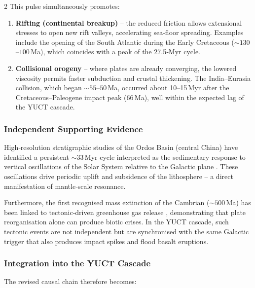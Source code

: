 \documentclass[11pt,a4paper]{article}
\begin{document}
\begin{multicols}{2}
		This pulse simultaneously promotes:
		
		\begin{enumerate}
			\item \textbf{Rifting (continental breakup)} – the reduced friction allows extensional 
			stresses to open new rift valleys, accelerating sea‑floor spreading.  
			Examples include the opening of the South Atlantic during the Early Cretaceous 
			(\(\sim 130\)–\(100\) Ma), which coincides with a peak of the 27.5‑Myr cycle.
			\item \textbf{Collisional orogeny} – where plates are already converging, the lowered 
			viscosity permits faster subduction and crustal thickening.  
			The India–Eurasia collision, which began \(\sim 55\)–\(50\) Ma, occurred about 
			10–15 Myr after the Cretaceous–Paleogene impact peak (66 Ma), well within the 
			expected lag of the YUCT cascade.
		\end{enumerate}
		
		\subsubsection{Independent Supporting Evidence}
		
		High‑resolution stratigraphic studies of the Ordos Basin (central China) have identified a 
		persistent \(\sim 33\) Myr cycle interpreted as the sedimentary response to vertical 
		oscillations of the Solar System relative to the Galactic plane \cite{Rampino2021}.  
		These oscillations drive periodic uplift and subsidence of the lithosphere – a direct 
		manifestation of mantle‑scale resonance.
		
		Furthermore, the first recognised mass extinction of the Cambrian (\(\sim 500\) Ma) has been 
		linked to tectonic‑driven greenhouse gas release \cite{Jablonski1991}, demonstrating that 
		plate reorganisation alone can produce biotic crises.  In the YUCT cascade, such tectonic 
		events are not independent but are synchronised with the same Galactic trigger that also 
		produces impact spikes and flood basalt eruptions.
		
		\subsubsection{Integration into the YUCT Cascade}
		
		The revised causal chain therefore becomes:
		
	\end{multicols}
	
\end{document}
